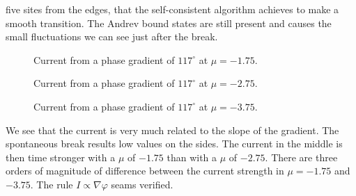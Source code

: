 \documentclass[..\main.tex]{subfile}
\begin{document}
 five sites from the edges, that the self-consistent
algorithm achieves to make a smooth transition. The Andrev bound states are still present and causes the small fluctuations we can see just after the
break.\\
\begin{figure}[H]
    
    \caption{Current from a phase gradient of $117^{\circ}$ at $\mu = -1.75$.}
\end{figure}
\begin{figure}[H]
    
    \caption{Current from a phase gradient of $117^{\circ}$ at $\mu = -2.75$.}
\end{figure}
\begin{figure}[H]
    
    \caption{Current from a phase gradient of $117^{\circ}$ at $\mu = -3.75$.}
\end{figure}

We see that the current is very much related to the slope of the gradient. 
The spontaneous break results low values on the sides. 
The current in the middle is then time stronger with a $\mu$ of $-1.75$ than with a $\mu$ of $-2.75$. There are three orders of magnitude
of difference between the current strength in $\mu = -1.75$ and $-3.75$. The rule $I\propto\nabla\varphi$ seams verified.\\
\end{document}
